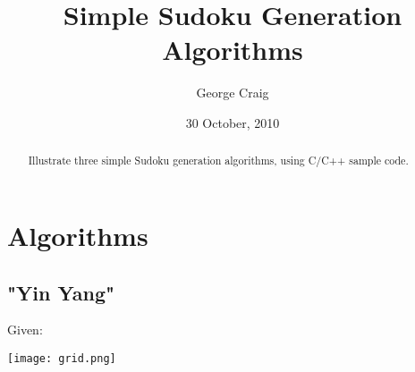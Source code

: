 \documentclass{article}
\begin{document}
\title{Simple Sudoku Generation Algorithms}
\author{George Craig}
\date{30 October, 2010}
\maketitle

\begin{abstract}
Illustrate three simple Sudoku generation algorithms, using C/C++ sample code.
\end{abstract}


\section{Algorithms}

\subsection{"Yin Yang"}

Given:

\begin{center}\texttt{[image: grid.png]}\end{center}
\end{document}
